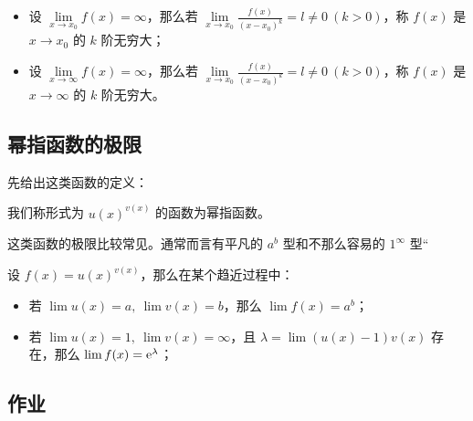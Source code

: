 \begin{definition}[无穷大的阶]
	\begin{itemize}
		\item 设 $\lim\limits_{x \to x_0} f(x) = \infty$，那么若 $\lim\limits_{x \to x_0} \frac{f(x)}{(x - x_0)^k} = l \neq 0\ (k > 0)$，称 $f(x)$ 是 $x \to x_0$ 的 $k$ 阶无穷大；
		\item 设 $\lim\limits_{x \to \infty} f(x) = \infty$，那么若 $\lim\limits_{x \to x_0} \frac{f(x)}{(x - x_0)^k} = l \neq 0\ (k > 0)$，称 $f(x)$ 是 $x \to \infty$ 的 $k$ 阶无穷大。
	\end{itemize}
\end{definition}

\subsection{幂指函数的极限}

先给出这类函数的定义：

\begin{definition}[幂指函数]
	我们称形式为 $u(x)^{v(x)}$ 的函数为幂指函数。
\end{definition}

这类函数的极限比较常见。通常而言有平凡的 $a^b$ 型和不那么容易的 $1^\infty$ 型“

\begin{theorem}
	设 $f(x) = u(x)^{v(x)}$，那么在某个趋近过程中：
	
	\begin{itemize}
		\item 若 $\lim u(x) = a,\ \lim v(x) = b$，那么 $\lim f(x) = a^b$；
		\item 若 $\lim u(x) = 1,\ \lim v(x) = \infty$，且 $\lambda = \lim (u(x) - 1) v(x)$ 存在，那么 $\lim f(x) = \mathrm{e}^{\lambda}$；
	\end{itemize}
\end{theorem}

\subsection{作业}


